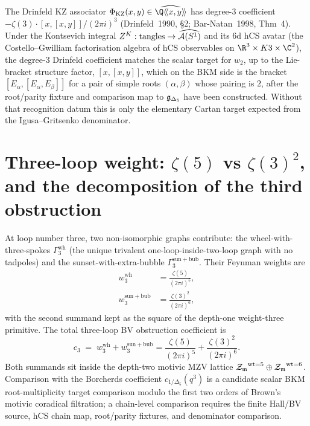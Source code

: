 \begin{remark}
\label{rem:drinfeld-associator-two-loop}
The Drinfeld KZ associator $\Phi_{\mathrm{KZ}}(x,y) \in \widehat{\Q
\langle\!\langle x, y\rangle\!\rangle}$ has degree-$3$ coefficient
$-\zeta(3)\cdot[x,[x,y]]/(2\pi i)^3$ (Drinfeld~1990, \S2;
Bar-Natan~1998, Thm~4). Under the Kontsevich integral
$Z^K: \text{tangles}\to \widehat{\mathcal{A}(S^1)}$ and its 6d hCS avatar (the
Costello--Gwilliam factorisation algebra of hCS observables on
$\R^3\times K3\times \C^2$), the degree-3 Drinfeld coefficient
matches the scalar target for \(w_2\), up to the Lie-bracket structure factor,
$[x,[x,y]]$, which on the BKM side is the bracket
$[E_\alpha, [E_\alpha, E_\beta]]$ for a pair of simple roots
$(\alpha,\beta)$ whose pairing is $2$, after the root/parity fixture and
comparison map to \(\mathfrak{g}_{\Delta_5}\) have been constructed. Without
that recognition datum this is only the elementary Cartan target expected
from the Igusa--Gritsenko denominator.
\end{remark}

\section{Three-loop weight: $\zeta(5)$ vs $\zeta(3)^2$, and the
decomposition of the third obstruction}
\label{sec:6d-hcs-three-loop}

\begin{theorem}
\label{thm:6d-hcs-three-loop-coefficient}
At loop number three, two non-isomorphic graphs contribute: the
wheel-with-three-spokes $\Gamma_3^{\mathrm{wh}}$ (the unique
trivalent one-loop-inside-two-loop graph with no tadpoles) and the
sunset-with-extra-bubble $\Gamma_3^{\mathrm{sun+bub}}$. Their
Feynman weights are
\begin{align}
\label{eq:three-loop-weight-wheel}
w_3^{\mathrm{wh}}
&= \frac{\zeta(5)}{(2\pi i)^5},
\\
\label{eq:three-loop-weight-sunplus}
w_3^{\mathrm{sun+bub}}
&= \frac{\zeta(3)^2}{(2\pi i)^6},
\end{align}
with the second summand kept as the square of the depth-one
weight-three primitive. The total three-loop BV obstruction
coefficient is
\[
c_3 \;=\; w_3^{\mathrm{wh}} + w_3^{\mathrm{sun+bub}}
= \frac{\zeta(5)}{(2\pi i)^5}
+ \frac{\zeta(3)^2}{(2\pi i)^6}.
\]
Both summands sit inside the depth-two motivic MZV lattice
${\mathcal{Z}_{\mathfrak m}}^{\mathrm{wt}=5}\oplus{\mathcal{Z}_{\mathfrak m}}^{\mathrm{wt}=6}$. Comparison with
the Borcherds coefficient $c_{1/\Delta_5}(q^3)$ is a candidate scalar
BKM root-multiplicity target comparison modulo the first two orders of
Brown's motivic coradical filtration; a chain-level comparison requires
the finite Hall/BV source, hCS chain map, root/parity fixtures, and
denominator comparison.
\end{theorem}


